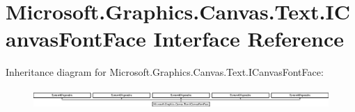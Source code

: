 \hypertarget{interface_microsoft_1_1_graphics_1_1_canvas_1_1_text_1_1_i_canvas_font_face}{}\section{Microsoft.\+Graphics.\+Canvas.\+Text.\+I\+Canvas\+Font\+Face Interface Reference}
\label{interface_microsoft_1_1_graphics_1_1_canvas_1_1_text_1_1_i_canvas_font_face}
Inheritance diagram for Microsoft.\+Graphics.\+Canvas.\+Text.\+I\+Canvas\+Font\+Face\+:\begin{figure}[H]
\begin{center}
\leavevmode
\includegraphics[height=0.732026cm]{interface_microsoft_1_1_graphics_1_1_canvas_1_1_text_1_1_i_canvas_font_face}
\end{center}
\end{figure}
